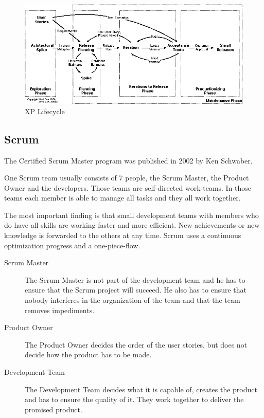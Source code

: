 \begin{figure}[h!]
   \includegraphics[width=1.0\columnwidth]{lifecycleXP}
   \caption{XP Lifecycle\protect\footnotemark}
\end{figure}


\subsection{Scrum}

The Certified Scrum Master program was published in 2002 by Ken Schwaber.

One Scrum team usually consists of 7 people, the Scrum Master, the Product
Owner and the developers. Those teams are self-directed work teams. In those
teams each member is able to manage all tasks and they all work together.

The most important finding is that small development teams with members who do
have all skills are working faster and more efficient. New achievements or new
knowledge is forwarded to the others at any time. Scrum uses a continuous
optimization progress and a one-piece-flow.~\cite{five}


\begin{description}
   \item[Scrum Master] The Scrum Master is not part of the development team and
           he has to ensure that the Scrum project will succeed. He also has
           to ensure that nobody interferes in the organization of the team
           and that the team removes impediments.
   \item[Product Owner] The Product Owner decides the order of the user 
           stories, but does not decide how the product has to be made.
   \item[Development Team] The Development Team decides what it is capable of, 
           creates the product and has to ensure the quality of it. They work
           together to deliver the promised product.~\cite{five,eight}
\end{description}

